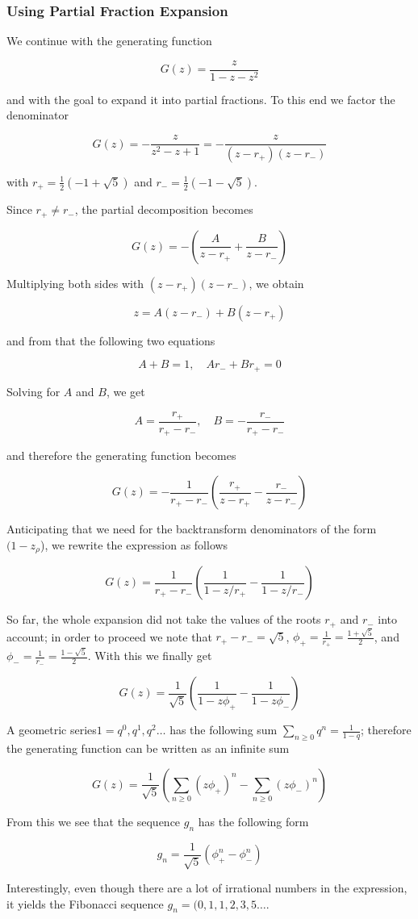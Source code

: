
\subsubsection{Using Partial Fraction
Expansion}\label{using-partial-fraction-expansion}

We continue with the generating function

\[ G(z) = \frac{z}{1-z-z^2} \]

and with the goal to expand it into partial fractions. To this end we
factor the denominator

\[G(z) = - \frac{z}{z^2 - z + 1} =  - \frac{z}{(z-r_+)(z-r_{-} )} \]

with $r_+=\frac{1}{2}(-1+\sqrt{5})$ and $r_{-}=\frac{1}{2}(-1-\sqrt{5})$.

Since $r_+ \neq r_-$, the partial decomposition becomes

\[G(z) = -\left( \frac{A}{z-r_+} + \frac{B}{z-r_{-}} \right) \]

Multiplying both sides with $(z-r_+)(z-r_-)$, we obtain

\[z = A(z-r_{-}) + B(z-r_+)\]

and from that the following two equations

\[A + B = 1, \quad A r_{-} + B r_{+} = 0\]

Solving for $A$ and $B$, we get

\[A = \frac{r_+}{r_{+} - r_{-}}, \quad B = -\frac{r_{-}}{r_{+} - r_-} \]

and therefore the generating function becomes

\[G(z) = - \frac{1}{r_{+} - r_-}\left(  \frac{r_+}{z-r_+} - \frac{r_-}{z-r_-} \right)\]

Anticipating that we need for the backtransform denominators of the form
$(1-z_\rho$), we rewrite the expression as
follows

\[G(z) = \frac{1}{r_{+} - r_-}\left( \frac{1}{1-z/r_+} - \frac{1}{1 - z/r_-} \right) \]

So far, the whole expansion did not take the values of the roots $r_+$ and $r_-$ into account; in order to proceed we note that $r_+ - r_- = \sqrt{5}$, $\phi_+ = \frac{1}{r_+}=\frac{1+\sqrt{5}}{2}$, and $\phi_- = \frac{1}{r_-}=\frac{1-\sqrt{5}}{2}$. With this we finally get

\[G(z) = \frac{1}{\sqrt{5}} \left( \frac{1}{1-z \phi_+} - \frac{1}{1 - z \phi_-} \right) \]

A geometric series$ 1 =q^0, q^1,q^2 \ldots$ has the following sum $\sum_{n \geq 0}q^n = \frac{1}{1-q}$; therefore the generating function can be written as an infinite sum

\[G(z) = \frac{1}{\sqrt{5}} \left( \sum_{n \geq 0} (z \phi_+)^n - \sum_{n \geq 0} (z \phi_-)^n \right) \]

From this we see that the sequence $g_n$ has the following form

\[g_n = \frac{1}{\sqrt{5}} \left( \phi_+^n - \phi_-^n \right) \]

Interestingly, even though there are a lot of irrational numbers in the expression, it yields the Fibonacci sequence $g_n=(0,1,1,2,3,5\ldots$.

